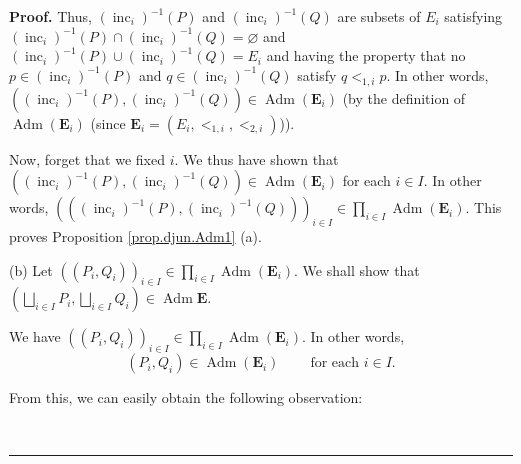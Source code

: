 \documentclass[numbers=enddot,12pt,final,onecolumn,notitlepage,abstracton]{scrartcl}
\theoremstyle{definition}
\newenvironment{proof}[1][Proof]{\noindent\textbf{#1.} }{\ \rule{0.5em}{0.5em}}
\let\prodnonlimits\prod
\renewcommand{\prod}{\prodnonlimits\limits}
\newenvironment{verlong}{}{}
\begin{document}
\begin{verlong}
\begin{footnotesize}
\begin{proof}
Thus, $\left(  \operatorname*{inc}\nolimits_{i}\right)  ^{-1}\left(  P\right)
$ and $\left(  \operatorname*{inc}\nolimits_{i}\right)  ^{-1}\left(  Q\right)
$ are subsets of $E_{i}$ satisfying $\left(  \operatorname*{inc}%
\nolimits_{i}\right)  ^{-1}\left(  P\right)  \cap\left(  \operatorname*{inc}%
\nolimits_{i}\right)  ^{-1}\left(  Q\right)  =\varnothing$ and $\left(
\operatorname*{inc}\nolimits_{i}\right)  ^{-1}\left(  P\right)  \cup\left(
\operatorname*{inc}\nolimits_{i}\right)  ^{-1}\left(  Q\right)  =E_{i}$ and
having the property that no $p\in\left(  \operatorname*{inc}\nolimits_{i}%
\right)  ^{-1}\left(  P\right)  $ and $q\in\left(  \operatorname*{inc}%
\nolimits_{i}\right)  ^{-1}\left(  Q\right)  $ satisfy $q<_{1,i}p$. In other
words, $\left(  \left(  \operatorname*{inc}\nolimits_{i}\right)  ^{-1}\left(
P\right)  ,\left(  \operatorname*{inc}\nolimits_{i}\right)  ^{-1}\left(
Q\right)  \right)  \in\operatorname*{Adm}\left(  \mathbf{E}_{i}\right)  $ (by
the definition of $\operatorname*{Adm}\left(  \mathbf{E}_{i}\right)  $ (since
$\mathbf{E}_{i}=\left(  E_{i},<_{1,i},<_{2,i}\right)  $)).

Now, forget that we fixed $i$. We thus have shown that $\left(  \left(
\operatorname*{inc}\nolimits_{i}\right)  ^{-1}\left(  P\right)  ,\left(
\operatorname*{inc}\nolimits_{i}\right)  ^{-1}\left(  Q\right)  \right)
\in\operatorname*{Adm}\left(  \mathbf{E}_{i}\right)  $ for each $i\in I$. In
other words, $\left(  \left(  \left(  \operatorname*{inc}\nolimits_{i}\right)
^{-1}\left(  P\right)  ,\left(  \operatorname*{inc}\nolimits_{i}\right)
^{-1}\left(  Q\right)  \right)  \right)  _{i\in I}\in\prod_{i\in
I}\operatorname*{Adm}\left(  \mathbf{E}_{i}\right)  $. This proves Proposition
\ref{prop.djun.Adm1} (a).

(b) Let $\left(  \left(  P_{i},Q_{i}\right)  \right)  _{i\in I}\in\prod_{i\in
I}\operatorname*{Adm}\left(  \mathbf{E}_{i}\right)  $. We shall show that
$\left(  \bigsqcup_{i\in I}P_{i},\bigsqcup_{i\in I}Q_{i}\right)
\in\operatorname*{Adm}\mathbf{E}$.

We have $\left(  \left(  P_{i},Q_{i}\right)  \right)  _{i\in I}\in\prod_{i\in
I}\operatorname*{Adm}\left(  \mathbf{E}_{i}\right)  $. In other words,%
\begin{equation}
\left(  P_{i},Q_{i}\right)  \in\operatorname*{Adm}\left(  \mathbf{E}%
_{i}\right)  \ \ \ \ \ \ \ \ \ \ \text{for each }i\in I.
\label{pf.prop.djun.Adm1.b.1}%
\end{equation}


From this, we can easily obtain the following observation:


\end{proof}
\end{footnotesize}
\end{verlong}
\end{document}
